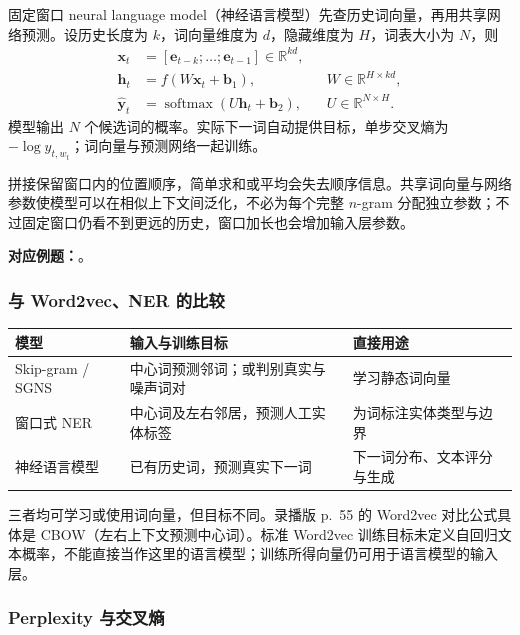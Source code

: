 固定窗口 neural language model（神经语言模型）先查历史词向量，再用共享网络预测。设历史长度为 $k$，词向量维度为 $d$，隐藏维度为 $H$，词表大小为 $N$，则
\begin{align*}
  \mathbf x_t&=[\mathbf e_{t-k};\ldots;\mathbf e_{t-1}]
     \in\mathbb R^{kd},\\
  \mathbf h_t&=f(W\mathbf x_t+\mathbf b_1),
     && W\in\mathbb R^{H\times kd},\\
  \hat{\mathbf y}_t&=\operatorname{softmax}(U\mathbf h_t+\mathbf b_2),
     && U\in\mathbb R^{N\times H}.
\end{align*}
模型输出 $N$ 个候选词的概率。实际下一词自动提供目标，单步交叉熵为 $-\log \hat y_{t,w_t}$；词向量与预测网络一起训练。

拼接保留窗口内的位置顺序，简单求和或平均会失去顺序信息。共享词向量与网络参数使模型可以在相似上下文间泛化，不必为每个完整 $n$-gram 分配独立参数；不过固定窗口仍看不到更远的历史，窗口加长也会增加输入层参数。

\textbf{对应例题：}。

\subsubsection{与 Word2vec、NER 的比较}

\begin{center}
\small
\begin{tabularx}{\textwidth}{@{}l X X@{}}
\toprule
模型 & 输入与训练目标 & 直接用途 \\
\midrule
Skip-gram / SGNS & 中心词预测邻词；或判别真实与噪声词对 & 学习静态词向量 \\
窗口式 NER & 中心词及左右邻居，预测人工实体标签 & 为词标注实体类型与边界 \\
神经语言模型 & 已有历史词，预测真实下一词 & 下一词分布、文本评分与生成 \\
\bottomrule
\end{tabularx}
\end{center}

三者均可学习或使用词向量，但目标不同。录播版 p.~55 的 Word2vec 对比公式具体是 CBOW（左右上下文预测中心词）。标准 Word2vec 训练目标未定义自回归文本概率，不能直接当作这里的语言模型；训练所得向量仍可用于语言模型的输入层。

\subsubsection{Perplexity 与交叉熵}

